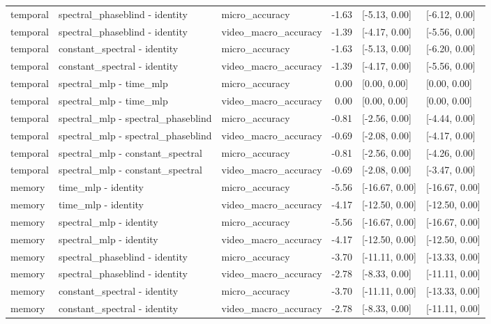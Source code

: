 \begin{tabular}{lllrll}
temporal & spectral\_phaseblind - identity & micro\_accuracy & -1.63 & [-5.13, 0.00] & [-6.12, 0.00] \\
temporal & spectral\_phaseblind - identity & video\_macro\_accuracy & -1.39 & [-4.17, 0.00] & [-5.56, 0.00] \\
temporal & constant\_spectral - identity & micro\_accuracy & -1.63 & [-5.13, 0.00] & [-6.20, 0.00] \\
temporal & constant\_spectral - identity & video\_macro\_accuracy & -1.39 & [-4.17, 0.00] & [-5.56, 0.00] \\
temporal & spectral\_mlp - time\_mlp & micro\_accuracy & 0.00 & [0.00, 0.00] & [0.00, 0.00] \\
temporal & spectral\_mlp - time\_mlp & video\_macro\_accuracy & 0.00 & [0.00, 0.00] & [0.00, 0.00] \\
temporal & spectral\_mlp - spectral\_phaseblind & micro\_accuracy & -0.81 & [-2.56, 0.00] & [-4.44, 0.00] \\
temporal & spectral\_mlp - spectral\_phaseblind & video\_macro\_accuracy & -0.69 & [-2.08, 0.00] & [-4.17, 0.00] \\
temporal & spectral\_mlp - constant\_spectral & micro\_accuracy & -0.81 & [-2.56, 0.00] & [-4.26, 0.00] \\
temporal & spectral\_mlp - constant\_spectral & video\_macro\_accuracy & -0.69 & [-2.08, 0.00] & [-3.47, 0.00] \\
memory & time\_mlp - identity & micro\_accuracy & -5.56 & [-16.67, 0.00] & [-16.67, 0.00] \\
memory & time\_mlp - identity & video\_macro\_accuracy & -4.17 & [-12.50, 0.00] & [-12.50, 0.00] \\
memory & spectral\_mlp - identity & micro\_accuracy & -5.56 & [-16.67, 0.00] & [-16.67, 0.00] \\
memory & spectral\_mlp - identity & video\_macro\_accuracy & -4.17 & [-12.50, 0.00] & [-12.50, 0.00] \\
memory & spectral\_phaseblind - identity & micro\_accuracy & -3.70 & [-11.11, 0.00] & [-13.33, 0.00] \\
memory & spectral\_phaseblind - identity & video\_macro\_accuracy & -2.78 & [-8.33, 0.00] & [-11.11, 0.00] \\
memory & constant\_spectral - identity & micro\_accuracy & -3.70 & [-11.11, 0.00] & [-13.33, 0.00] \\
memory & constant\_spectral - identity & video\_macro\_accuracy & -2.78 & [-8.33, 0.00] & [-11.11, 0.00] \\

\end{tabular}
